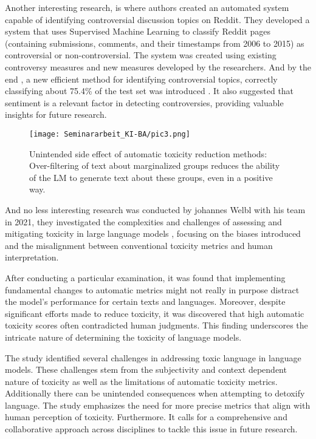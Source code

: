  Another interesting research, is where authors created an automated system capable of identifying controversial discussion topics on Reddit. They developed a system that uses Supervised Machine Learning to classify Reddit pages (containing submissions, comments, and their timestamps from 2006 to 2015) as controversial or non-controversial. The system was created using existing controversy measures and new measures developed by the researchers. And by the end , a new efficient method for identifying controversial topics, correctly classifying about 75.4\% of the test set was introduced . It also suggested that sentiment is a relevant factor in detecting controversies, providing valuable insights for future research.\cite{opa2016}

 
\begin{figure}
\centering
\texttt{[image: Seminararbeit\_KI-BA/pic3.png]}
\caption{\label{fig:frog}Unintended side effect of automatic toxicity reduction methods: Over-filtering of text about marginalized groups reduces the ability of the LM to generate text about these groups, even in a positive way.}
\end{figure}


And no less interesting research was conducted by johannes Welbl with his team in 2021, they investigated the complexities and challenges of assessing and mitigating toxicity in large language models , focusing on the biases introduced and the misalignment between conventional toxicity metrics and human interpretation.

After conducting a particular examination, it was found that implementing fundamental changes to automatic metrics might not really in purpose distract the model's performance for certain texts and languages. Moreover, despite significant efforts made to reduce toxicity, it was discovered that high automatic toxicity scores often contradicted human judgments. This finding underscores the intricate nature of determining the toxicity of language models.


The study identified several challenges in addressing toxic language in language models. These challenges stem from the subjectivity and context dependent nature of toxicity as well as the limitations of automatic toxicity metrics. Additionally there can be unintended consequences when attempting to detoxify language. The study emphasizes the need for more precise metrics that align with human perception of toxicity. Furthermore. It calls for a comprehensive and collaborative approach across disciplines to tackle this issue in future research.\cite{jw2021}


